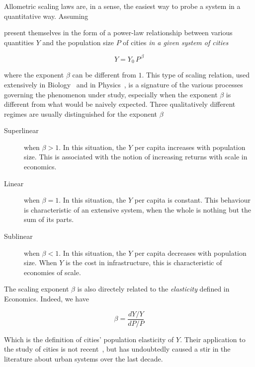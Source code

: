 Allometric scaling laws are, in a sense, the easiest way to probe a system in a
quantitative way. Assuming 

present themselves in the form of a power-law
relationship between various quantities $Y$ and the population size $P$ of
cities \emph{in a given system of cities} 

\begin{equation}
    Y = Y_0\,P^{\,\beta}
    \label{eq:scaling_definition}
\end{equation}

where the exponent $\beta$ can be different from $1$. This type of scaling
relation, used extensively in Biology~\cite{Thompson:1942} and in
Physics~\cite{Barenblatt:1996}, is a signature of the various processes
governing the phenomenon under study, especially when the exponent $\beta$ is
different from what would be naively expected. Three qualitatively different regimes are
usually
distinguished for the exponent $\beta$~\cite{Bettencourt:2007}

\begin{description}
    \item[Superlinear] when $\beta>1$. In this situation, the $Y$ per capita
        increases with population size. This is associated with the notion of
        increasing returns with scale in economics.
    \item[Linear] when $\beta=1$. In this situation, the $Y$ per capita is
        constant. This behaviour is characteristic of an extensive system, when
        the whole is nothing but the sum of its parts.
    \item[Sublinear] when $\beta<1$. In this situation, the $Y$ per capita
        decreases with population size. When $Y$ is the cost in infrastructure,
        this is characteristic of economies of scale.
\end{description}    

The scaling exponent $\beta$ is also directely related to the \emph{elasticity}
defined in Economics. Indeed, we have

\begin{equation}
    \beta = \frac{dY/Y}{dP/P}
\end{equation}

Which is the definition of cities' population elasticity of $Y$. Their application to the study of cities
is not recent~\cite{Stewart:1947}, but has undoubtedly caused a stir in the
literature about urban systems over the last decade.\\


